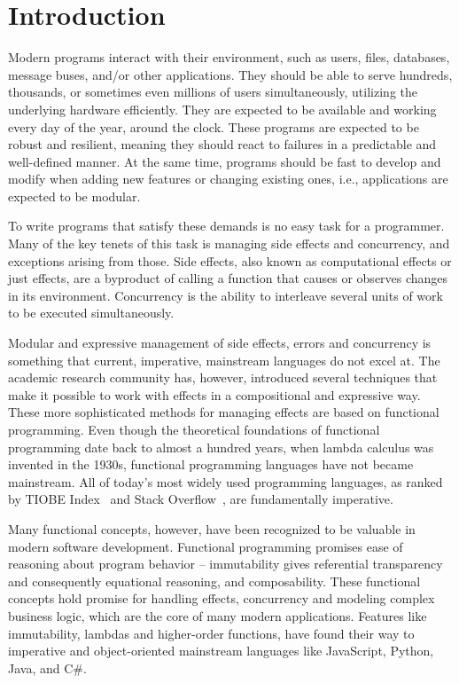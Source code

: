 \chapter{Introduction} \label{Introduction}

Modern programs interact with their environment, such as users, files, databases, message buses, and/or other applications. They should be able to serve hundreds, thousands, or sometimes even millions of users simultaneously, utilizing the underlying hardware efficiently. They are expected to be available and working every day of the year, around the clock. These programs are expected to be robust and resilient, meaning they should react to failures in a predictable and well-defined manner. At the same time, programs should be fast to develop and modify when adding new features or changing existing ones, i.e., applications are expected to be modular.

To write programs that satisfy these demands is no easy task for a programmer. Many of the key tenets of this task is managing side effects and concurrency, and exceptions arising from those. Side effects, also known as computational effects or just effects, are a byproduct of calling a function that causes or observes changes in its environment. Concurrency is the ability to interleave several units of work to be executed simultaneously.

Modular and expressive management of side effects, errors and concurrency is something that current, imperative, mainstream languages do not excel at. The academic research community has, however, introduced several techniques that make it possible to work with effects in a compositional and expressive way. These more sophisticated methods for managing effects are based on functional programming. Even though the theoretical foundations of functional programming date back to almost a hundred years, when lambda calculus was invented in the 1930s, functional programming languages have not became mainstream. All of today's most widely used programming languages, as ranked by TIOBE Index~\cite{tiobe-index} and Stack Overflow~\cite{sof-dev-survey}, are fundamentally imperative.

Many functional concepts, however, have been recognized to be valuable in modern software development. Functional programming promises ease of reasoning about program behavior -- immutability gives referential transparency and consequently equational reasoning, and composability. These functional concepts hold promise for handling effects, concurrency and modeling complex business logic, which are the core of many modern applications. Features like immutability, lambdas and higher-order functions, have found their way to imperative and object-oriented mainstream languages like JavaScript, Python, Java, and C\#.

